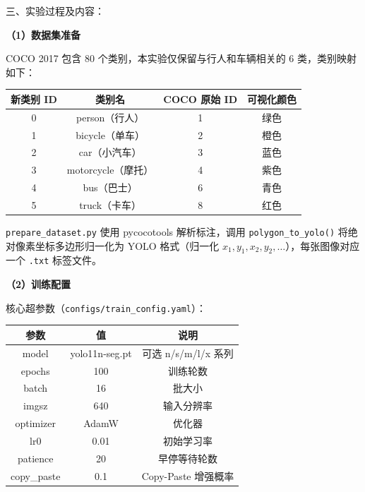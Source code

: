 \documentclass[12pt, a4paper]{article}
\begin{document}
\begin{labbox}{三、实验过程及内容：}{}

\textbf{（1）数据集准备}

COCO 2017 包含 80 个类别，本实验仅保留与行人和车辆相关的 6 类，类别映射如下：

\vspace{0.3cm}
\begin{center}
\begin{tabular}{|c|c|c|c|}
    \hline
    \textbf{新类别 ID} & \textbf{类别名} & \textbf{COCO 原始 ID} & \textbf{可视化颜色} \\
    \hline
    0 & person（行人）   & 1 & 绿色   \\
    1 & bicycle（单车）  & 2 & 橙色   \\
    2 & car（小汽车）    & 3 & 蓝色   \\
    3 & motorcycle（摩托）& 4 & 紫色   \\
    4 & bus（巴士）      & 6 & 青色   \\
    5 & truck（卡车）    & 8 & 红色   \\
    \hline
\end{tabular}
\end{center}
\vspace{0.3cm}

\texttt{prepare\_dataset.py} 使用 pycocotools 解析标注，调用 \texttt{polygon\_to\_yolo()} 将绝对像素坐标多边形归一化为 YOLO 格式（归一化 $x_1,y_1,x_2,y_2,\ldots$），每张图像对应一个 \texttt{.txt} 标签文件。

\vspace{0.3cm}
\textbf{（2）训练配置}

核心超参数（\texttt{configs/train\_config.yaml}）：

\vspace{0.3cm}
\begin{center}
\begin{tabular}{|c|c|c|}
    \hline
    \textbf{参数} & \textbf{值} & \textbf{说明} \\
    \hline
    model    & yolo11n-seg.pt & 可选 n/s/m/l/x 系列 \\
    epochs   & 100            & 训练轮数 \\
    batch    & 16             & 批大小 \\
    imgsz    & 640            & 输入分辨率 \\
    optimizer& AdamW          & 优化器 \\
    lr0      & 0.01           & 初始学习率 \\
    patience & 20             & 早停等待轮数 \\
    copy\_paste & 0.1         & Copy-Paste 增强概率 \\
    \hline
\end{tabular}
\end{center}
\vspace{0.3cm}


\end{labbox}
\end{document}
